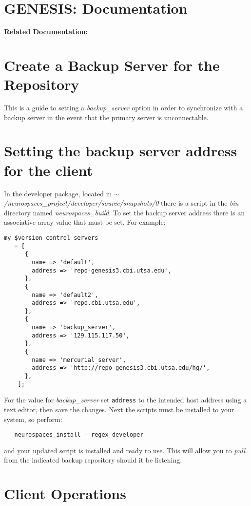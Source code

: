 \documentclass[12pt]{article}
\begin{document}
\section*{GENESIS: Documentation}

{\bf Related Documentation:}

\section*{Create a Backup Server for the Repository}

This is a guide to setting a {\it backup\_server} option in order to synchronize with a backup server in the event that the primary server is unconnectable.

\section*{Setting the backup server address for the client}

In the developer package, located in {\it $\sim$/neurospaces\_project/developer/source/snapshots/0} there is a script in the {\it bin} directory named {\it neurospaces\_build}. To set the backup server address there is an associative array value that must be set. For example:

\begin{verbatim}
my $version_control_servers
   = [
      {
        name => 'default',
        address => 'repo-genesis3.cbi.utsa.edu',
      },
      {
        name => 'default2',
        address => 'repo.cbi.utsa.edu',
      },
      {
        name => 'backup_server',
        address => '129.115.117.50',
      },
      {
        name => 'mercurial_server',
        address => 'http://repo-genesis3.cbi.utsa.edu/hg/',
      },
    ];
\end{verbatim}
For the value for {\it backup\_server} set {\tt address} to the intended host address using a text editor, then save the changes. Next the scripts must be installed to your system, so perform:
\begin{verbatim}
   neurospaces_install --regex developer
\end{verbatim}
and your updated script is installed and ready to use. This will allow you to {\it pull} from the indicated backup repository should it be listening.

\section*{Client Operations}
\end{document}

